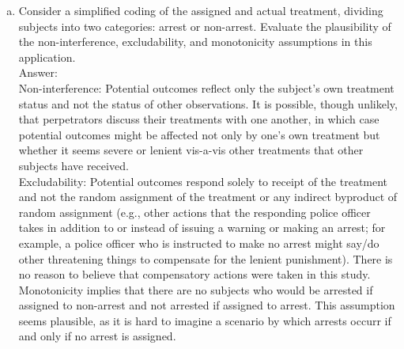\documentclass[11pt,notitlepage]{article}\usepackage[]{graphicx}\usepackage[]{color}
\begin{document}
\begin{enumerate}[a)]
\item Consider a simplified coding of the assigned and actual treatment, dividing subjects into two categories: arrest or non-arrest. Evaluate the plausibility of the non-interference, excludability, and monotonicity assumptions in this application.\\
Answer:\\
Non-interference: Potential outcomes reflect only the subject's own treatment status and not the status of other observations. It is possible, though unlikely, that perpetrators discuss their treatments with one another, in which case potential outcomes might be affected not only by one's own treatment but whether it seems severe or lenient vis-a-vis other treatments that other subjects have received.\\
Excludability: Potential outcomes respond solely to receipt of the treatment and not the random assignment of the treatment or any indirect byproduct of random assignment (e.g., other actions that the responding police officer takes in addition to or instead of issuing a warning or making an arrest; for example, a police officer who is instructed to make no arrest might say/do other threatening things to compensate for the lenient punishment). There is no reason to believe that compensatory actions were taken in this study. \\
Monotonicity implies that there are no subjects who would be arrested if assigned to non-arrest and not arrested if assigned to arrest. This assumption seems plausible, as it is hard to imagine a scenario by which arrests occurr if and only if no arrest is assigned. 


\end{enumerate}
\end{document}
